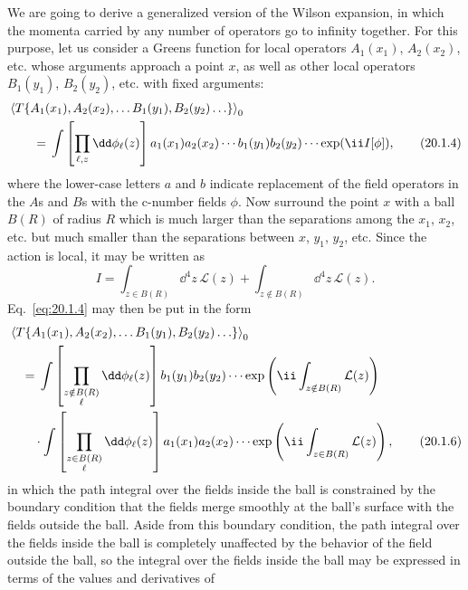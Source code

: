 We are going to derive a generalized version of the Wilson expansion, in
which the momenta carried by any number of operators go to infinity together.
For this purpose, let us consider a Greens function for local operators
$A_1(x_1)$, $A_2(x_2)$, etc. whose arguments approach a point $x$, as well
as other local operators $B_1(y_1)$, $B_2(y_2)$, etc. with fixed arguments:
\begin{align}
 &\left\langle
 T\{A_1(x_1),A_2(x_2),\ldots B_1(y_1),B_2(y_2)\ldots\}
 \right\rangle_0
 \notag\\
 &\qquad={}
 \int\left[\prod_{\ell,z}\dd\phi_\ell(z)\right]
 a_1(x_1)a_2(x_2)\cdots b_1(y_1)b_2(y_2)\cdots
 \exp(\ii I[\phi]),
 \tag{20.1.4}\label{eq:20.1.4}
\end{align}
where the lower-case letters $a$ and $b$ indicate replacement of the field
operators in the $A$s and $B$s with the c-number fields $\phi$. Now surround
the point $x$ with a ball $B(R)$ of radius $R$ which is much larger than the
separations among the $x_1$, $x_2$, etc. but much smaller than the
separations between $x$, $y_1$, $y_2$, etc. Since the action is local, it may
be written as
\begin{equation}
 I=\int_{z\in B(R)}\dd^4z\,\mathcal L(z)
  +\int_{z\notin B(R)}\dd^4z\,\mathcal L(z).
 \tag{20.1.5}\label{eq:20.1.5}
\end{equation}
Eq.~\eqref{eq:20.1.4} may then be put in the form
\begin{align}
 &\left\langle
 T\{A_1(x_1),A_2(x_2),\ldots B_1(y_1),B_2(y_2)\ldots\}
 \right\rangle_0
 \notag\\
 &\quad={}
 \int\left[\prod_{\substack{z\notin B(R)\\ \ell}}\dd\phi_\ell(z)\right]
 b_1(y_1)b_2(y_2)\cdots
 \exp\left(\ii\int_{z\notin B(R)}\mathcal L(z)\right)
 \notag\\
 &\qquad{}\cdot
 \int\left[\prod_{\substack{z\in B(R)\\ \ell}}\dd\phi_\ell(z)\right]
 a_1(x_1)a_2(x_2)\cdots
 \exp\left(\ii\int_{z\in B(R)}\mathcal L(z)\right),
 \tag{20.1.6}\label{eq:20.1.6}
\end{align}
in which the path integral over the fields inside the ball is constrained by
the boundary condition that the fields merge smoothly at the ball's surface
with the fields outside the ball. Aside from this boundary condition, the
path integral over the fields inside the ball is completely unaffected by
the behavior of the field outside the ball, so the integral over the fields
inside the ball may be expressed in terms of the values and derivatives of
